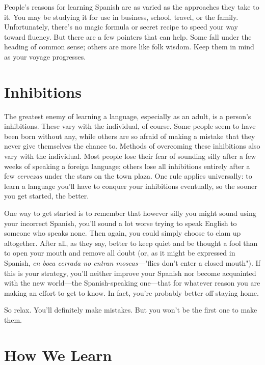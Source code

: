 People's reasons for learning Spanish are as varied as the approaches they take to it. You may be studying it for use in business,
school, travel, or the family. Unfortunately, there's no magic formula
or secret recipe to speed your way toward fluency. But there are a few
pointers that can help. Some fall under the heading of common sense;
others are more like folk wisdom. Keep them in mind as your voyage
progresses.

\section{Inhibitions}

The greatest enemy of learning a language, especially as an
adult, is a person's inhibitions. These vary with the individual, of
course. Some people seem to have been born without any, while others are so afraid of making a mistake that they never give themselves
the chance to. Methods of overcoming these inhibitions also vary with
the individual. Most people lose their fear of sounding silly after a few
weeks of speaking a foreign language; others lose all inhibitions entirely after a few \emph{cervezas} under the stars on the town plaza. One rule
applies universally: to learn a language you'll have to conquer your inhibitions eventually, so the sooner you get started, the better.

One way to get started is to remember that however silly you
might sound using your incorrect Spanish, you'll sound a lot worse trying to speak English to someone who speaks none. Then again, you
could simply choose to clam up altogether. After all, as they say, better
to keep quiet and be thought a fool than to open your mouth and remove all doubt (or, as it might be expressed in Spanish, \emph{en boca cerrada no entran moscas}---"flies don't enter a closed mouth"). If this
is your strategy, you'll neither improve your Spanish nor become acquainted with the new world---the Spanish-speaking one---that for
whatever reason you are making an effort to get to know. In fact, you're
probably better off staying home.

So relax. You'll definitely make mistakes. But you won't be the
first one to make them.

\section{How We Learn}

